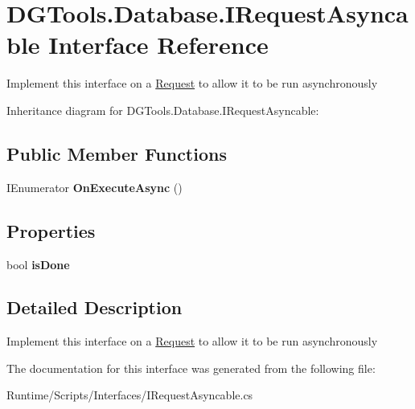 \hypertarget{interface_d_g_tools_1_1_database_1_1_i_request_asyncable}{}\section{D\+G\+Tools.\+Database.\+I\+Request\+Asyncable Interface Reference}
\label{interface_d_g_tools_1_1_database_1_1_i_request_asyncable}


Implement this interface on a \mbox{\hyperlink{class_d_g_tools_1_1_database_1_1_request}{Request}} to allow it to be run asynchronously  




Inheritance diagram for D\+G\+Tools.\+Database.\+I\+Request\+Asyncable\+:
\subsection*{Public Member Functions}
\begin{DoxyCompactItemize}
\item 
\mbox{\label{interface_d_g_tools_1_1_database_1_1_i_request_asyncable_a09d9cfadeb96a5f90fb028d77b97eeee}} 
I\+Enumerator {\bfseries On\+Execute\+Async} ()
\end{DoxyCompactItemize}
\subsection*{Properties}
\begin{DoxyCompactItemize}
\item 
\mbox{\label{interface_d_g_tools_1_1_database_1_1_i_request_asyncable_a9583ad99121a725d54abe4f98ba1fd4a}} 
bool {\bfseries is\+Done}
\end{DoxyCompactItemize}


\subsection{Detailed Description}
Implement this interface on a \mbox{\hyperlink{class_d_g_tools_1_1_database_1_1_request}{Request}} to allow it to be run asynchronously 



The documentation for this interface was generated from the following file\+:\begin{DoxyCompactItemize}
\item 
Runtime/\+Scripts/\+Interfaces/I\+Request\+Asyncable.\+cs\end{DoxyCompactItemize}
